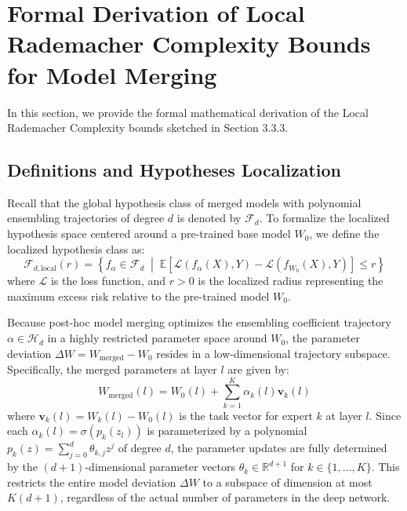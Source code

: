\documentclass{article}
\theoremstyle{plain}
\theoremstyle{definition}
\theoremstyle{remark}
\begin{document}
\section{Formal Derivation of Local Rademacher Complexity Bounds for Model Merging}
\label{sec:appendix_local_rademacher}

In this section, we provide the formal mathematical derivation of the Local Rademacher Complexity bounds sketched in Section 3.3.3.

\subsection{Definitions and Hypotheses Localization}
Recall that the global hypothesis class of merged models with polynomial ensembling trajectories of degree $d$ is denoted by $\mathcal{F}_d$. To formalize the localized hypothesis space centered around a pre-trained base model $W_0$, we define the localized hypothesis class as:
\begin{equation}
\mathcal{F}_{d, \text{local}}(r) = \left\{ f_{\alpha} \in \mathcal{F}_d \;\middle|\; \mathbb{E} \left[ \mathcal{L}(f_{\alpha}(X), Y) - \mathcal{L}(f_{W_0}(X), Y) \right] \le r \right\}
\end{equation}
where $\mathcal{L}$ is the loss function, and $r > 0$ is the localized radius representing the maximum excess risk relative to the pre-trained model $W_0$.

Because post-hoc model merging optimizes the ensembling coefficient trajectory $\alpha \in \mathcal{H}_d$ in a highly restricted parameter space around $W_0$, the parameter deviation $\Delta W = W_{\text{merged}} - W_0$ resides in a low-dimensional trajectory subspace. Specifically, the merged parameters at layer $l$ are given by:
\begin{equation}
W_{\text{merged}}(l) = W_0(l) + \sum_{k=1}^K \alpha_k(l) \mathbf{v}_k(l)
\end{equation}
where $\mathbf{v}_k(l) = W_k(l) - W_0(l)$ is the task vector for expert $k$ at layer $l$. Since each $\alpha_k(l) = \sigma(p_k(z_l))$ is parameterized by a polynomial $p_k(z) = \sum_{j=0}^d \theta_{k,j} z^j$ of degree $d$, the parameter updates are fully determined by the $(d+1)$-dimensional parameter vectors $\theta_k \in \mathbb{R}^{d+1}$ for $k \in \{1, \dots, K\}$. This restricts the entire model deviation $\Delta W$ to a subspace of dimension at most $K(d+1)$, regardless of the actual number of parameters in the deep network.
\end{document}
